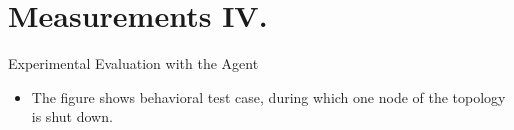 \documentclass[hyperref={pdfpagelabels=false, unicode},pdf,slideColor,fyma,9pt]{beamer}
\begin{document}
    \section{Measurements IV.}
    \begin{frame}{Experimental Evaluation with the Agent}
      \begin{itemize}
          \setlength\itemsep{0.5em}
          \item The figure shows behavioral test case, during which one node of the topology is shut down.
      \end{itemize}
      \begin{figure}[ht]
        \begin{center}
        \end{center}
      \end{figure}
    \end{frame}
\end{document}
